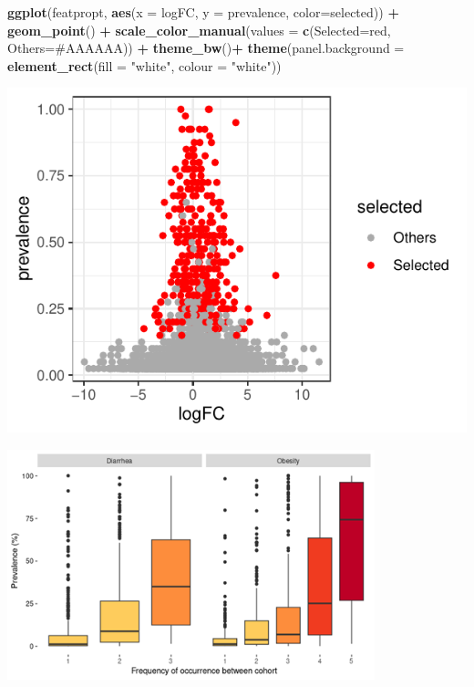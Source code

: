 \documentclass[
]{article}
\newenvironment{Shaded}{\begin{snugshade}}{\end{snugshade}}
\newcommand{\AttributeTok}[1]{\textcolor[rgb]{0.13,0.29,0.53}{#1}}
\newcommand{\FunctionTok}[1]{\textcolor[rgb]{0.13,0.29,0.53}{\textbf{#1}}}
\newcommand{\NormalTok}[1]{#1}
\newcommand{\OtherTok}[1]{\textcolor[rgb]{0.56,0.35,0.01}{#1}}
\newcommand{\SpecialCharTok}[1]{\textcolor[rgb]{0.81,0.36,0.00}{\textbf{#1}}}
\newcommand{\StringTok}[1]{\textcolor[rgb]{0.31,0.60,0.02}{#1}}
\begin{document}
\begin{Shaded}
\begin{Highlighting}[]

\FunctionTok{ggplot}\NormalTok{(featpropt, }\FunctionTok{aes}\NormalTok{(}\AttributeTok{x =}\NormalTok{ logFC, }\AttributeTok{y =}\NormalTok{ prevalence, }\AttributeTok{color=}\NormalTok{selected)) }\SpecialCharTok{+} \FunctionTok{geom\_point}\NormalTok{() }\SpecialCharTok{+}
  \FunctionTok{scale\_color\_manual}\NormalTok{(}\AttributeTok{values =} \FunctionTok{c}\NormalTok{(}\StringTok{\textquotesingle{}Selected\textquotesingle{}}\OtherTok{=}\StringTok{\textquotesingle{}red\textquotesingle{}}\NormalTok{, }\StringTok{\textquotesingle{}Others\textquotesingle{}}\OtherTok{=}\StringTok{\textquotesingle{}\#AAAAAA\textquotesingle{}}\NormalTok{)) }\SpecialCharTok{+} 
  \FunctionTok{theme\_bw}\NormalTok{()}\SpecialCharTok{+} \FunctionTok{theme}\NormalTok{(}\AttributeTok{panel.background =} \FunctionTok{element\_rect}\NormalTok{(}\AttributeTok{fill =} \StringTok{"white"}\NormalTok{, }\AttributeTok{colour =} \StringTok{"white"}\NormalTok{))}
\end{Highlighting}
\end{Shaded}

\includegraphics{workshop_files/figure-latex/unnamed-chunk-48-2.pdf}

\includegraphics[width=0.8\textwidth,height=\textheight]{images/Fig19.png}
\end{document}
